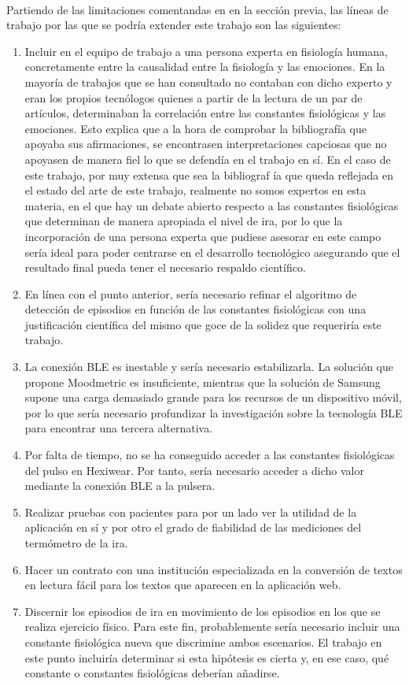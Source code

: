 \paragraph{}
Partiendo de las limitaciones comentandas en en la sección previa, las líneas de trabajo por las que se podría extender este trabajo son las siguientes:
\begin{enumerate}
    \item Incluir en el equipo de trabajo a una persona experta en fisiología humana, concretamente entre la causalidad entre la fisiología y las emociones. En la mayoría de trabajos que se han consultado no contaban con dicho experto y eran los propios tecnólogos quienes a partir de la lectura de un par de artículos, determinaban la correlación entre las constantes fisiológicas y las emociones. Esto explica que a la hora de comprobar la bibliografía que apoyaba sus afirmaciones, se encontrasen interpretaciones capciosas que no apoyasen de manera fiel lo que se defendía en el trabajo en sí. En el caso de este trabajo, por muy extensa que sea la bibliograf
   ía que queda reflejada en el estado del arte de este trabajo, realmente no somos expertos en esta materia, en el que hay un debate abierto respecto a las constantes fisiológicas que determinan de manera apropiada el nivel de ira, por lo que la incorporación de una persona experta que pudiese asesorar en este campo sería ideal para poder centrarse en el desarrollo tecnológico asegurando que el resultado final pueda tener el necesario respaldo científico.
   \item En línea con el punto anterior, sería necesario refinar el algoritmo de detección de episodios en función de las constantes fisiológicas con una justificación científica del mismo que goce de la solidez que requeriría este trabajo.
   \item La conexión BLE es inestable y sería necesario estabilizarla. La solución que propone Moodmetric es insuficiente, mientras que la solución de Samsung supone una carga demasiado grande para los recursos de un dispositivo móvil, por lo que sería necesario profundizar la investigación sobre la tecnología BLE para encontrar una tercera alternativa.
   \item Por falta de tiempo, no se ha conseguido acceder a las constantes fisiológicas del pulso en Hexiwear. Por tanto, sería necesario acceder a dicho valor mediante la conexión BLE a la pulsera.
   \item Realizar pruebas con pacientes para por un lado ver la utilidad de la aplicación en sí y por otro el grado de fiabilidad de las mediciones del termómetro de la ira.
   \item Hacer un contrato con una institución especializada en la conversión de textos en lectura fácil para los textos que aparecen en la aplicación web.
   \item Discernir los episodios de ira en movimiento de los episodios en los que se realiza ejercicio físico. Para este fin, probablemente sería necesario incluir una constante fisiológica nueva que discrimine ambos escenarios. El trabajo en este punto incluiría determinar si esta hipótesis es cierta y, en ese caso, qué constante o constantes fisiológicas deberían añadirse.
\end{enumerate}